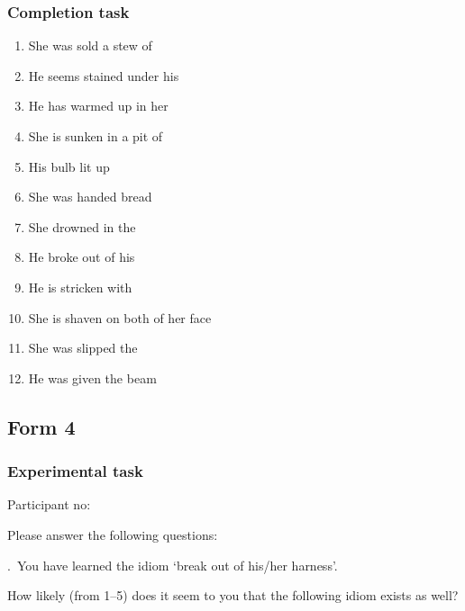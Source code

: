 \documentclass[output=paper]{langsci/langscibook}
\begin{document}
\begin{paperappendix}
\subsubsection*{Completion task}
    \begin{enumerate}[nosep]
        \item She was sold a stew of \underline{\hphantom{3em}}
        \item He seems stained under his  \underline{\hphantom{3em}}
        \item He has warmed up in her  \underline{\hphantom{3em}}
        \item She is sunken in a pit of  \underline{\hphantom{3em}}
        \item His \underline{\hphantom{3em}} bulb lit up
        \item She was handed   \underline{\hphantom{3em}}  bread
        \item She drowned in the  \underline{\hphantom{3em}}   \underline{\hphantom{3em}}
        \item He  broke out of his  \underline{\hphantom{3em}}
        \item He is stricken with  \underline{\hphantom{3em}}
        \item She is shaven on both  \underline{\hphantom{3em}}  of her face
        \item She was slipped the \underline{\hphantom{3em}}
        \item He was given the \underline{\hphantom{3em}} beam
    \end{enumerate}
\subsection{Form 4}

\subsubsection*{Experimental task}

\noindent Participant no: \underline{\hphantom{3em}}

\noindent Please answer the following questions:\vspace{.5\baselineskip}

.\ You have learned the idiom \enquote*{{break out of his/her harness}}.

\noindent How likely (from 1--5) does it seem to you that the following idiom
exists as well?\vspace{.5\baselineskip}


\end{paperappendix}
\end{document}
